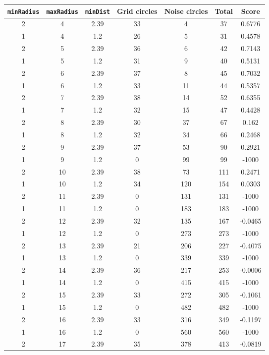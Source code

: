 \documentclass[letterpaper, 12pt]{article}
\begin{document}
\begin{longtable}{|c|c|c|c|c|c|c|}
\hline
\textbf{\texttt{minRadius}} & \textbf{\texttt{maxRadius}} & \textbf{\texttt{minDist}} & \textbf{Grid circles} & \textbf{Noise circles} & \textbf{Total} & \textbf{Score} \\
\hline
2 & 4 & 2.39 & 33 & 4 & 37 & 0.6776 \\
\hline
1 & 4 & 1.2 & 26 & 5 & 31 & 0.4578 \\
\hline
2 & 5 & 2.39 & 36 & 6 & 42 & 0.7143 \\
\hline
1 & 5 & 1.2 & 31 & 9 & 40 & 0.5131 \\
\hline
2 & 6 & 2.39 & 37 & 8 & 45 & 0.7032 \\
\hline
1 & 6 & 1.2 & 33 & 11 & 44 & 0.5357 \\
\hline
2 & 7 & 2.39 & 38 & 14 & 52 & 0.6355 \\
\hline
1 & 7 & 1.2 & 32 & 15 & 47 & 0.4428 \\
\hline
2 & 8 & 2.39 & 30 & 37 & 67 & 0.162 \\
\hline
1 & 8 & 1.2 & 32 & 34 & 66 & 0.2468 \\
\hline
2 & 9 & 2.39 & 37 & 53 & 90 & 0.2921 \\
\hline
1 & 9 & 1.2 & 0 & 99 & 99 & -1000 \\
\hline
2 & 10 & 2.39 & 38 & 73 & 111 & 0.2471 \\
\hline
1 & 10 & 1.2 & 34 & 120 & 154 & 0.0303 \\
\hline
2 & 11 & 2.39 & 0 & 131 & 131 & -1000 \\
\hline
1 & 11 & 1.2 & 0 & 183 & 183 & -1000 \\
\hline
2 & 12 & 2.39 & 32 & 135 & 167 & -0.0465 \\
\hline
1 & 12 & 1.2 & 0 & 273 & 273 & -1000 \\
\hline
2 & 13 & 2.39 & 21 & 206 & 227 & -0.4075 \\
\hline
1 & 13 & 1.2 & 0 & 339 & 339 & -1000 \\
\hline
2 & 14 & 2.39 & 36 & 217 & 253 & -0.0006 \\
\hline
1 & 14 & 1.2 & 0 & 415 & 415 & -1000 \\
\hline
2 & 15 & 2.39 & 33 & 272 & 305 & -0.1061 \\
\hline
1 & 15 & 1.2 & 0 & 482 & 482 & -1000 \\
\hline
2 & 16 & 2.39 & 33 & 316 & 349 & -0.1197 \\
\hline
1 & 16 & 1.2 & 0 & 560 & 560 & -1000 \\
\hline
2 & 17 & 2.39 & 35 & 378 & 413 & -0.0819 \\

\end{longtable}
\end{document}
